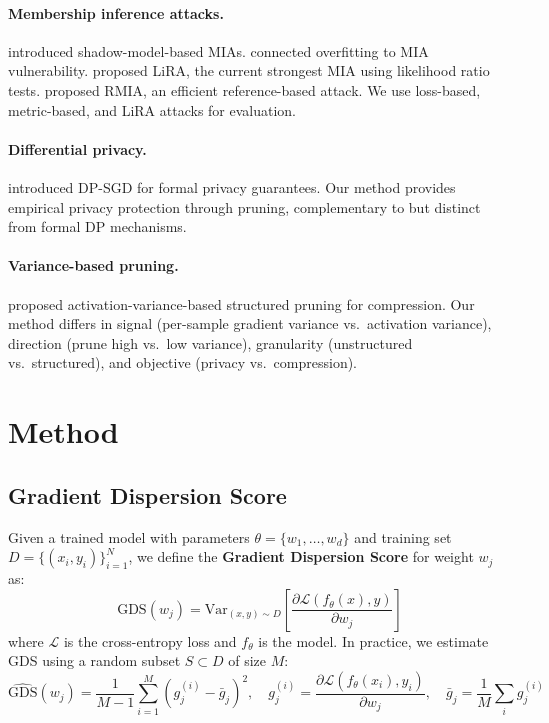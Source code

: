 \documentclass{article}
\newcommand{\gds}{\text{GDS}}
\begin{document}
\paragraph{Membership inference attacks.}
\citet{shokri2017membership} introduced shadow-model-based MIAs. \citet{yeom2018privacy} connected overfitting to MIA vulnerability. \citet{carlini2022membership} proposed LiRA, the current strongest MIA using likelihood ratio tests. \citet{zarifzadeh2024low} proposed RMIA, an efficient reference-based attack. We use loss-based, metric-based, and LiRA attacks for evaluation.

\paragraph{Differential privacy.}
\citet{abadi2016deep} introduced DP-SGD for formal privacy guarantees. Our method provides empirical privacy protection through pruning, complementary to but distinct from formal DP mechanisms.

\paragraph{Variance-based pruning.}
\citet{berisha2025variance} proposed activation-variance-based structured pruning for compression. Our method differs in signal (per-sample gradient variance vs.\ activation variance), direction (prune high vs.\ low variance), granularity (unstructured vs.\ structured), and objective (privacy vs.\ compression).

\section{Method}
\label{sec:method}

\subsection{Gradient Dispersion Score}

Given a trained model with parameters $\theta = \{w_1, \ldots, w_d\}$ and training set $D = \{(x_i, y_i)\}_{i=1}^{N}$, we define the \textbf{Gradient Dispersion Score} for weight $w_j$ as:
\begin{equation}
    \gds(w_j) = \text{Var}_{(x,y) \sim D} \left[ \frac{\partial \mathcal{L}(f_\theta(x), y)}{\partial w_j} \right]
\end{equation}
where $\mathcal{L}$ is the cross-entropy loss and $f_\theta$ is the model. In practice, we estimate GDS using a random subset $S \subset D$ of size $M$:
\begin{equation}
    \widehat{\gds}(w_j) = \frac{1}{M-1} \sum_{i=1}^{M} \left( g_j^{(i)} - \bar{g}_j \right)^2, \quad g_j^{(i)} = \frac{\partial \mathcal{L}(f_\theta(x_i), y_i)}{\partial w_j}, \quad \bar{g}_j = \frac{1}{M} \sum_i g_j^{(i)}
\end{equation}
\end{document}
